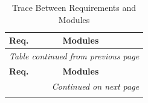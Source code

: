 \documentclass[12pt, titlepage]{article}
\begin{document}
\begin{longtable}{p{} p{}}
\caption{Trace Between Requirements and Modules}\label{TblRT}\\
\toprule
\textbf{Req.} & \textbf{Modules}\\
\midrule
\endfirsthead

\multicolumn{2}{l}{\textit{Table \thetable{} continued from previous page}}\\
\toprule
\textbf{Req.} & \textbf{Modules}\\
\midrule
\endhead

\midrule
\multicolumn{2}{r}{\textit{Continued on next page}}\\
\endfoot

\bottomrule
\endlastfoot


\end{longtable}
\end{document}
